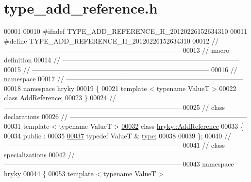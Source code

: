 \hypertarget{type__add__reference_8h_source}{\section{type\-\_\-add\-\_\-reference.\-h}
}

\begin{DoxyCode}
00001 
00010 \textcolor{preprocessor}{#ifndef TYPE\_ADD\_REFERENCE\_H\_20120226152634310}
00011 \textcolor{preprocessor}{}\textcolor{preprocessor}{#define TYPE\_ADD\_REFERENCE\_H\_20120226152634310}
00012 \textcolor{preprocessor}{}\textcolor{comment}{//
      ------------------------------------------------------------------------------}
00013 \textcolor{comment}{// macro definition}
00014 \textcolor{comment}{//
      ------------------------------------------------------------------------------}
00015 \textcolor{comment}{//
      ------------------------------------------------------------------------------}
00016 \textcolor{comment}{// namespace}
00017 \textcolor{comment}{//
      ------------------------------------------------------------------------------}
00018 \textcolor{keyword}{namespace }hryky
00019 \{
00021     \textcolor{keyword}{template} < \textcolor{keyword}{typename} ValueT >
00022     \textcolor{keyword}{class }AddReference;
00023 \}
00024 \textcolor{comment}{//
      ------------------------------------------------------------------------------}
00025 \textcolor{comment}{// class declarations}
00026 \textcolor{comment}{//
      ------------------------------------------------------------------------------}
00031 \textcolor{comment}{}\textcolor{keyword}{template} < \textcolor{keyword}{typename} ValueT >
\hypertarget{type__add__reference_8h_source_l00032}{}\hyperlink{classhryky_1_1_add_reference}{00032} \textcolor{keyword}{class }\hyperlink{classhryky_1_1_add_reference}{hryky::AddReference}
00033 \{
00034 \textcolor{keyword}{public} :
00035 
\hypertarget{type__add__reference_8h_source_l00037}{}\hyperlink{classhryky_1_1_add_reference_a4b90c1381625432ba6152b7388bc4399}{00037}     \textcolor{keyword}{typedef} ValueT &       \hyperlink{classhryky_1_1_add_reference_a4b90c1381625432ba6152b7388bc4399}{type};
00038 
00039 \};
00040 \textcolor{comment}{//
      ------------------------------------------------------------------------------}
00041 \textcolor{comment}{// class specializations}
00042 \textcolor{comment}{//
      ------------------------------------------------------------------------------}
00043 \textcolor{keyword}{namespace }hryky
00044 \{
00053 \textcolor{keyword}{template} < \textcolor{keyword}{typename} ValueT >

\end{DoxyCode}
